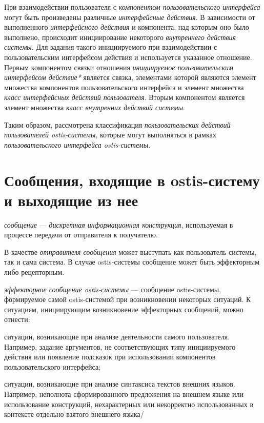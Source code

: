 При взаимодействии пользователя с \textit{компонентом пользовательского интерфейса} могут быть произведены различные \textit{интерфейсные действия}. В зависимости от выполненного \textit{интерфейсного действия} и компонента, над которым оно было выполнено, происходит инициирование некоторого \textit{внутреннего действия системы}. Для задания такого инициируемого при взаимодействии с пользовательским интерфейсом действия и используется указанное отношение. Первым компонентом связки отношения \textit{инициируемое пользовательским интерфейсом действие*} является связка, элементами которой являются элемент множества компонентов пользовательского интерфейса и элемент множества \textit{класс интерфейсных действий пользователя}. Вторым компонентом является элемент множества \textit{класс внутренних действий системы}.

Таким образом, рассмотрена классификация \textit{пользовательских действий пользователей ostis-системы}, которые могут выполняться в рамках \textit{пользовательского интерфейса ostis-системы}.

\section{Сообщения, входящие в ostis-систему и выходящие из нее}
\label{sec_messages}

\textit{сообщение} --- \textit{дискретная информационная конструкция}, используемая в процессе передачи от отправителя к получателю.

В качестве \textit{отправителя сообщения} может выступать как пользователь системы, так и сама система. В случае ostis-системы сообщение может быть эффекторным либо рецепторным.

\textit{эффекторное сообщение ostis-системы} --- сообщение ostis-системы, формируемое самой ostis-системой при возникновении некоторых ситуаций. К ситуациям, инициирующим возникновение эффекторных сообщений, можно отнести:
\begin{textitemize}
	\item ситуации, возникающие при анализе деятельности самого пользователя. Например, задание аргументов, не соответствующих типу инициируемого действия или появление подсказок при использовании компонентов пользовательского интерфейса;
	\item ситуации, возникающие при анализе синтаксиса текстов внешних языков. Например, неполнота сформированного предложения на внешнем языке или использование конструкций, нехарактерных или некорректно использованных в контексте отдельно взятого внешнего языка/
\end{textitemize}


